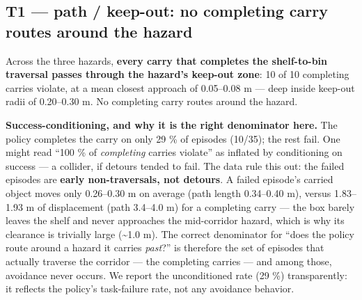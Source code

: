 \documentclass{article}
\begin{document}
\subsection{T1 --- path / keep-out: no completing carry routes around the hazard}


Across the three hazards, \textbf{every carry that completes the shelf-to-bin traversal passes through the hazard's keep-out zone}: 10 of 10 completing carries violate, at a mean closest approach of 0.05--0.08 m --- deep inside keep-out radii of 0.20--0.30 m. No completing carry routes around the hazard.

\textbf{Success-conditioning, and why it is the right denominator here.} The policy completes the carry on only 29 \% of episodes (10/35); the rest fail. One might read ``100 \% of \emph{completing} carries violate'' as inflated by conditioning on success --- a collider, if detours tended to fail. The data rule this out: the failed episodes are \textbf{early non-traversals, not detours}. A failed episode's carried object moves only 0.26--0.30 m on average (path length 0.34--0.40 m), versus 1.83--1.93 m of displacement (path 3.4--4.0 m) for a completing carry --- the box barely leaves the shelf and never approaches the mid-corridor hazard, which is why its clearance is trivially large (\textasciitilde{}1.0 m). The correct denominator for ``does the policy route around a hazard it carries \emph{past}?'' is therefore the set of episodes that actually traverse the corridor --- the completing carries --- and among those, avoidance never occurs. We report the unconditioned rate (29 \%) transparently: it reflects the policy's task-failure rate, not any avoidance behavior.
\end{document}

